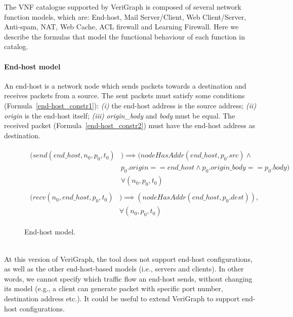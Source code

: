 
The VNF catalogue supported by VeriGraph is composed of several network function models, which are: End-host, Mail Server/Client, Web Client/Server, Anti-spam, NAT, Web Cache, ACL firewall and Learning Firewall. Here we describe the formulas that model the functional behaviour of each function in catalog.


\paragraph{End-host model}
An end-host is a network node which sends packets towards a destination and receives packets from a source. The sent packets must satisfy some conditions (Formula~\ref{end-host_constr1}): \textit{(i)} the end-host address is the source address; \textit{(ii)} \textit{origin} is the end-host itself; \textit{(iii)} \textit{origin\_body} and \textit{body}  must be equal. The received packet (Formula~\ref{end-host_constr2}) must have the end-host address as destination. 
\begin{figure}[h]
	{\footnotesize
		\begin{subequations}
			\begin{align}
				\begin{split}
					\label{end-host_constr1}
					(send(end\_host, n_{0}, p_{0}, t_{0}) &) \implies (nodeHasAddr(end\_host, p_{0}.src) \wedge \\
					& p_{0}.origin == end\_host \wedge p_{0}.origin\_body == p_{0}.body) \\
					& \forall (n_{0}, p_{0}, t_{0})
				\end{split} \\
				\begin{split}
					\label{end-host_constr2}
					(recv(n_{0}, end\_host, p_{0}, t_{0}) &) \implies (nodeHasAddr(end\_host, p_{0}.dest)),\\
					& \forall (n_{0}, p_{0}, t_{0})
				\end{split}
			\end{align}
		\end{subequations}
	}%
	\caption{End-host model.}
	\label{end-host_model}
\end{figure}
\\
At this version of VeriGraph, the tool does not support end-host configurations, as well as the other end-host-based models (i.e., servers and clients). In other words, we cannot specify which traffic flow an end-host sends, without changing its model (e.g., a client can generate packet with specific port number, destination address etc.). It could be useful to extend VeriGraph to support end-host configurations.

